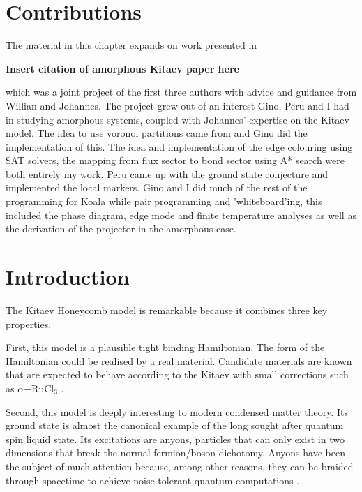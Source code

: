 \hypertarget{contributions}{%
\section{Contributions}\label{contributions}}

The material in this chapter expands on work presented in

\textbf{Insert citation of amorphous Kitaev paper here}

which was a joint project of the first three authors with advice and guidance from Willian and Johannes. The project grew out of an interest Gino, Peru and I had in studying amorphous systems, coupled with Johannes' expertise on the Kitaev model. The idea to use voronoi partitions came from \autocite{marsalTopologicalWeaireThorpe2020} and Gino did the implementation of this. The idea and implementation of the edge colouring using SAT solvers, the mapping from flux sector to bond sector using A* search were both entirely my work. Peru came up with the ground state conjecture and implemented the local markers. Gino and I did much of the rest of the programming for Koala while pair programming and 'whiteboard'ing, this included the phase diagram, edge mode and finite temperature analyses as well as the derivation of the projector in the amorphous case.

\hypertarget{introduction}{%
\section{Introduction}\label{introduction}}

The Kitaev Honeycomb model is remarkable because it combines three key properties.

First, this model is a plausible tight binding Hamiltonian. The form of the Hamiltonian could be realised by a real material. Candidate materials are known that are expected to behave according to the Kitaev with small corrections such as \(\alpha\mathrm{-RuCl}_3\) \autocite{banerjeeProximateKitaevQuantum2016,trebstKitaevMaterials2022}.

Second, this model is deeply interesting to modern condensed matter theory. Its ground state is almost the canonical example of the long sought after quantum spin liquid state. Its excitations are anyons, particles that can only exist in two dimensions that break the normal fermion/boson dichotomy. Anyons have been the subject of much attention because, among other reasons, they can be braided through spacetime to achieve noise tolerant quantum computations \autocite{freedmanTopologicalQuantumComputation2003}.


